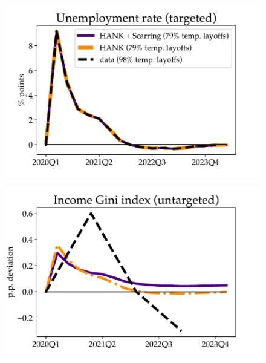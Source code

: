 \begin{figure}[t!] %
\centering
\begin{minipage}{0.51\textwidth}
\includegraphics[scale=.57]{text/chapter1/Figures/GR_sim/Cleaner/Urate_pandemic}
 \label{fig:a}
\end{minipage}\hspace*{\fill}
\begin{minipage}{0.51\textwidth}
\includegraphics[scale=.57]{text/chapter1/Figures/GR_sim/Cleaner/income_gini_pandemic}
 \label{fig:b}
\end{minipage}





\end{figure}
